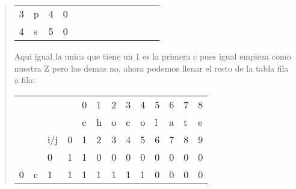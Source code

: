 \begin{quote}
\begin{table}[H]
\begin{tabular}{lllllllllllll}
          3 & p & \multicolumn{1}{l|}{4} & \multicolumn{1}{l|}{0} & \multicolumn{1}{l|}{}  & \multicolumn{1}{l|}{}  & \multicolumn{1}{l|}{}  & \multicolumn{1}{l|}{}  & \multicolumn{1}{l|}{}  & \multicolumn{1}{l|}{}  & \multicolumn{1}{l|}{}  & \multicolumn{1}{l|}{}  & \multicolumn{1}{l|}{}  \\ \cline{4-13} 
          4 & s & \multicolumn{1}{l|}{5} & \multicolumn{1}{l|}{0} & \multicolumn{1}{l|}{}  & \multicolumn{1}{l|}{}  & \multicolumn{1}{l|}{}  & \multicolumn{1}{l|}{}  & \multicolumn{1}{l|}{}  & \multicolumn{1}{l|}{}  & \multicolumn{1}{l|}{}  & \multicolumn{1}{l|}{}  & \multicolumn{1}{l|}{}  \\ \cline{4-13} 
          \end{tabular}
    \end{table}

    Aqui igual la unica que tiene un 1 es la primera c pues igual empieza como nuestra Z pero las demas no, ahora podemos llenar el resto de la tabla fila a fila: \vspace{.2cm}
    \begin{table}[H]
        \centering
        \begin{tabular}{lllllllllllll}
            &   &                        &                        & 0                      & 1                      & 2                      & 3                      & 4                      & 5                      & 6                      & 7                      & 8                      \\
            &   &                        &                        & c                      & h                      & o                      & c                      & o                      & l                      & a                      & t                      & e                      \\
            &   & i/j                    & 0                      & 1                      & 2                      & 3                      & 4                      & 5                      & 6                      & 7                      & 8                      & 9                      \\ \cline{4-13} 
            &   & \multicolumn{1}{l|}{0} & \multicolumn{1}{l|}{1} & \multicolumn{1}{l|}{1} & \multicolumn{1}{l|}{0} & \multicolumn{1}{l|}{0} & \multicolumn{1}{l|}{0} & \multicolumn{1}{l|}{0} & \multicolumn{1}{l|}{0} & \multicolumn{1}{l|}{0} & \multicolumn{1}{l|}{0} & \multicolumn{1}{l|}{0} \\ \cline{4-13} 
          0 & c & \multicolumn{1}{l|}{1} & \multicolumn{1}{l|}{1} & \multicolumn{1}{l|}{1} & \multicolumn{1}{l|}{1} & \multicolumn{1}{l|}{1} & \multicolumn{1}{l|}{1} & \multicolumn{1}{l|}{1} & \multicolumn{1}{l|}{0} & \multicolumn{1}{l|}{0} & \multicolumn{1}{l|}{0} & \multicolumn{1}{l|}{0} \\ \cline{4-13} 

\end{tabular}
\end{table}
\end{quote}
